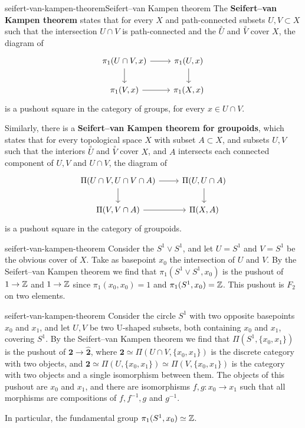 \begin{topic}{seifert-van-kampen-theorem}{Seifert--van Kampen theorem}
    The \textbf{Seifert--van Kampen theorem} states that for every   $X$ and path-connected subsets $U, V \subset X$ such that the intersection $U \cap V$ is path-connected and the  $\overset{\circ}{U}$ and $\overset{\circ}{V}$ cover $X$, the diagram of 
    \[ \begin{tikzcd} \pi_1(U \cap V, x) \arrow{d} \arrow{r} & \pi_1(U, x) \arrow{d} \\ \pi_1(V, x) \arrow{r} & \pi_1(X, x) \end{tikzcd} \]
    is a pushout square in the category of groups, for every $x \in U \cap V$.

    Similarly, there is a \textbf{Seifert--van Kampen theorem for groupoids}, which states that for every topological space $X$ with subset $A \subset X$, and subsets $U, V$ such that the interiors $\overset{\circ}{U}$ and $\overset{\circ}{V}$ cover $X$, and $A$ intersects each connected component of $U, V$ and $U \cap V$, the diagram of 
    \[ \begin{tikzcd} \Pi(U \cap V, U \cap V \cap A) \arrow{d} \arrow{r} & \Pi(U, U \cap A) \arrow{d} \\ \Pi(V, V \cap A) \arrow{r} & \Pi(X, A) \end{tikzcd} \]
    is a pushout square in the category of groupoids.
\end{topic}

\begin{example}{seifert-van-kampen-theorem}
    Consider the  $S^1 \vee S^1$, and let $U = S^1$ and $V = S^1$ be the obvious cover of $X$. Take as basepoint $x_0$ the intersection of $U$ and $V$. By the Seifert--van Kampen theorem we find that $\pi_1(S^1 \vee S^1, x_0)$ is the pushout of $1 \to \mathbb{Z}$ and $1 \to \mathbb{Z}$ since $\pi_1(x_0, x_0) = 1$ and $\pi_1(S^1, x_0) = \mathbb{Z}$. This pushout is  $F_2$ on two elements.
\end{example}

\begin{example}{seifert-van-kampen-theorem}
    Consider the circle $S^1$ with two opposite basepoints $x_0$ and $x_1$, and let $U, V$ be two U-shaped subsets, both containing $x_0$ and $x_1$, covering $S^1$. By the Seifert--van Kampen theorem we find that $\Pi(S^1, \{ x_0, x_1 \})$ is the pushout of $\textbf{2} \to \hat{\textbf{2}}$, where $\textbf{2} \simeq \Pi(U \cap V, \{ x_0, x_1 \})$ is the discrete category with two objects, and $\hat{\textbf{2}} \simeq \Pi(U, \{ x_0, x_1 \}) \simeq \Pi(V, \{ x_0, x_1 \})$ is the category with two objects and a single isomorphism between them. The objects of this pushout are $x_0$ and $x_1$, and there are isomorphisms $f, g : x_0 \to x_1$ such that all morphisms are compositions of $f, f^{-1}, g$ and $g^{-1}$.
    
    In particular, the fundamental group $\pi_1(S^1, x_0) \simeq \mathbb{Z}$.
\end{example}

